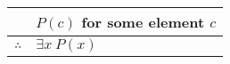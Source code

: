 \documentclass{standalone}
\begin{document}
\begin{tabular}{rl}
    & $P\left(c\right)$ for some element $c$ \\
    \hline
    $\therefore$ & $\exists x\ P\left(x\right)$    
\end{tabular}
\end{document}
